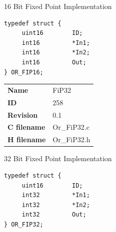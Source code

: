 16 Bit Fixed Point Implementation

\begin{lstlisting}
typedef struct {
     uint16        ID;
     int16         *In1;
     int16         *In2;
     int16         Out;
} OR_FIP16;
\end{lstlisting}

\ifdefined \AddTestReports
{}
\fi
{}
\nopagebreak[0]
\begin{tabular}{l l}
\textbf{Name} & FiP32 \tabularnewline
\textbf{ID} & 258 \tabularnewline
\textbf{Revision} & 0.1 \tabularnewline
\textbf{C filename} & Or\_FiP32.c \tabularnewline
\textbf{H filename} & Or\_FiP32.h \tabularnewline
\end{tabular}
\vspace{1ex}

32 Bit Fixed Point Implementation

\begin{lstlisting}
typedef struct {
     uint16        ID;
     int32         *In1;
     int32         *In2;
     int32         Out;
} OR_FIP32;
\end{lstlisting}

\ifdefined \AddTestReports
{}
\fi
